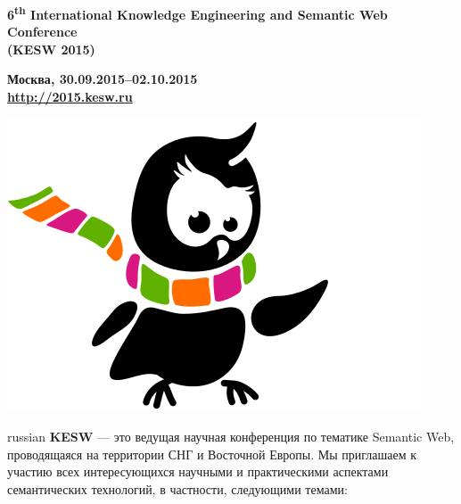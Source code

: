 \documentclass[a4paper, 10pt]{article}
\newcommand{\rus}[1]{\foreignlanguage{russian}{#1}}
\renewcommand{\skip}{\vspace{1ex}}
\begin{document}
\begin{minipage}{.80\textwidth}
\begin{center}

\Large{\bf 6\textsuperscript{th} International Knowledge Engineering and Semantic Web Conference 
\\ (KESW 2015)}

\skip\skip

\large{\bf \rus{Москва}, 30.09.2015--02.10.2015  \\ \url{http://2015.kesw.ru}}
\end{center}

\end{minipage}
\hfill
\begin{minipage}{.21\textwidth}

\includegraphics[width=\textwidth]{kesw}

\end{minipage}

\skip\skip

\begin{otherlanguage*}{russian}
\noindent
\textbf{KESW} --- это ведущая научная конференция по тематике Semantic Web, проводящаяся на территории СНГ и Восточной Европы. Мы приглашаем к участию всех интересующихся научными и практическими аспектами семантических технологий, в частности, следующими темами:
\end{otherlanguage*}

\skip
\skip
\end{document}
